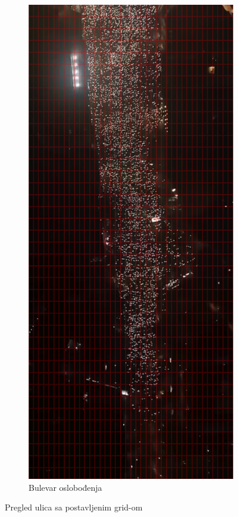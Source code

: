 \documentclass[a4paper,12pt]{article}
\begin{document}
\begin{figure}[H]
\begin{subfigure}[b]{0.3\textwidth}
	\end{subfigure}
	\hfill
	\begin{subfigure}[b]{0.3\textwidth}
	  \centering
	  \includegraphics[width=\textwidth]{../outputs/grid_output/bulevar-oslobodjenja_grid.png}
	  \caption{Bulevar oslobođenja}
	  \label{fig:bulevar-oslobodjenja}
	\end{subfigure}
  
	\caption{Pregled ulica sa postavljenim grid-om}
\end{figure}
\end{document}
